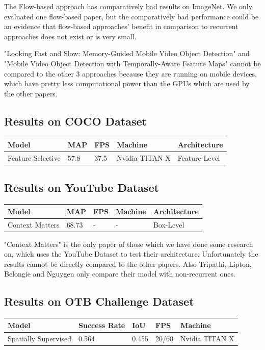 \documentclass[conference]{IEEEtran}
\begin{document}
The Flow-based approach \cite{3} has comparatively bad results on ImageNet. We only evaluated one flow-based paper, but the comparatively bad performance could be an evidence that flow-based approaches' benefit in comparison to recurrent approaches does not exist or is very small. \newline

"Looking Fast and Slow: Memory-Guided Mobile Video Object Detection" and "Mobile Video Object Detection with Temporally-Aware Feature Maps" cannot be compared to the other 3 approaches because they are running on mobile devices, which have pretty less computational power than the GPUs which are used by the other papers.  

\subsection{Results on COCO Dataset}

\begin{tabular}{ | p{2cm} | p{2em}| p{2em} | p{4em} | p{5em} | } 
 \hline
 Model & MAP & FPS & Machine & Architecture \\
 \hline
 Feature Selective \cite{b6} & 57.8 & 37.5 & Nvidia TITAN X & Feature-Level \\
 \hline
\end{tabular}

\subsection{Results on YouTube Dataset}

\begin{tabular}{ | p{2cm} | p{2em}| p{2em} | p{4em} | p{5em} | } 
 \hline
 Model & MAP & FPS & Machine & Architecture \\
 \hline
 Context Matters \cite{b4} & 68.73 & - & - & Box-Level \\
 \hline
\end{tabular} \newline

"Context Matters" is the only paper of those which we have done some research on, which uses the YouTube Dataset to test their architecture. Unfortunately the results cannot be directly compared to the other papers. Also Tripathi, Lipton, Belongie and Nguygen only compare their model with non-recurrent ones. \newline

\subsection{Results on OTB Challenge Dataset}
\begin{tabular}{ | p{2cm} | p{3em}| p{2em} | p{4em} | p{4em} | } 
 \hline
 Model & Success Rate & IoU & FPS & Machine \\
 \hline
 Spatially Supervised \cite{b5} & 0.564 & 0.455 & 20/60 & Nvidia TITAN X \\
 \hline
\end{tabular} \newline
\end{document}
